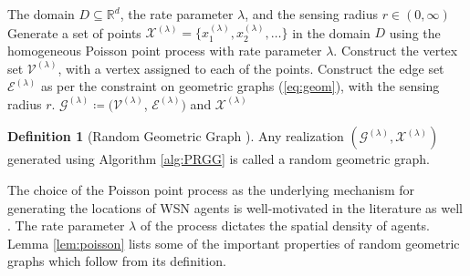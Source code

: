 \documentclass[twocolumn]{article}
\theoremstyle{plain}
\theoremstyle{definition}
\newtheorem*{definition}{Definition}
\theoremstyle{definition}
\theoremstyle{remark}
\newtheorem{remark}{Remark}
\begin{document}
\begin{algorithm}
\caption{Generative mechanism for random geometric graphs}
\begin{algorithmic}[1]
\REQUIRE The domain $D\subseteq \mathbb R^d$,  the rate parameter $\lambda$, and the sensing radius $r\in(0, \infty)$ 
\STATE Generate a set of points $\mathcal X^{(\lambda)} = \lbrace x^{(\lambda)}_1, x^{(\lambda)}_2, \dots \rbrace$ in the domain $D$ using the homogeneous Poisson point process with rate parameter $\lambda$.
\STATE Construct the vertex set $\mathcal V^{(\lambda)}$, with a vertex assigned to each of the points.
\STATE Construct the edge set $\mathcal E^{(\lambda)}$ as per the constraint on geometric graphs (\ref{eq:geom}), with the sensing radius $r$.
\RETURN $\mathcal G^{(\lambda)}\coloneqq (\mathcal V^{(\lambda)}$, $\mathcal E^{(\lambda)})$ and $\mathcal X^{(\lambda)}$
\end{algorithmic}
\label{alg:PRGG}
\end{algorithm}
\begin{definition}[Random Geometric Graph \cite{gilbert1961random}]
Any realization $(\mathcal G^{(\lambda)}, \mathcal X^{(\lambda)})$ generated using Algorithm \ref{alg:PRGG} is called a random geometric graph.
\end{definition}
The choice of the Poisson point process as the underlying mechanism for generating the locations of WSN agents is well-motivated in the literature as well \cite{haenggi2012stochastic, WSN2021}. %
The rate parameter $\lambda$ of the process dictates the spatial density of agents. Lemma \ref{lem:poisson} lists some of the important properties of random geometric graphs which follow from its definition.
\end{document}
